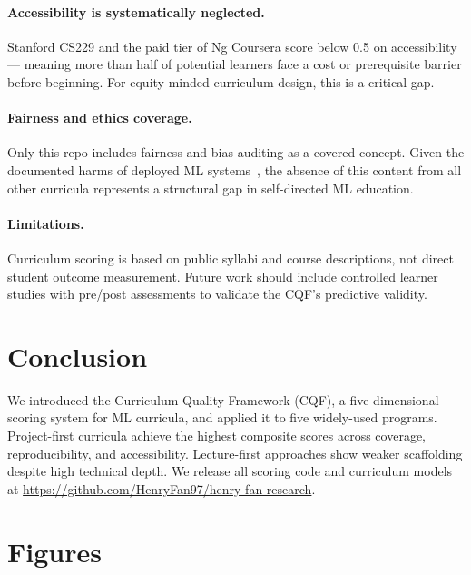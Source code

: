 \documentclass[10pt,twocolumn]{article}
\begin{document}
\paragraph{Accessibility is systematically neglected.}
Stanford CS229 and the paid tier of Ng Coursera score below 0.5 on accessibility—
meaning more than half of potential learners face a cost or prerequisite barrier 
before beginning. For equity-minded curriculum design, this is a critical gap.

\paragraph{Fairness and ethics coverage.}
Only this repo includes fairness and bias auditing as a covered concept. 
Given the documented harms of deployed ML systems~\citep{buolamwini2018gender, 
benjamin2019race}, the absence of this content from all other curricula represents 
a structural gap in self-directed ML education.

\paragraph{Limitations.}
Curriculum scoring is based on public syllabi and course descriptions, 
not direct student outcome measurement. Future work should include controlled 
learner studies with pre/post assessments to validate the CQF's predictive validity.

\section{Conclusion}

We introduced the Curriculum Quality Framework (CQF), a five-dimensional scoring 
system for ML curricula, and applied it to five widely-used programs.
Project-first curricula achieve the highest composite scores across coverage, 
reproducibility, and accessibility. Lecture-first approaches show weaker scaffolding 
despite high technical depth. We release all scoring code and curriculum models 
at \url{https://github.com/HenryFan97/henry-fan-research}.




\appendix

\section{Figures}
\end{document}
